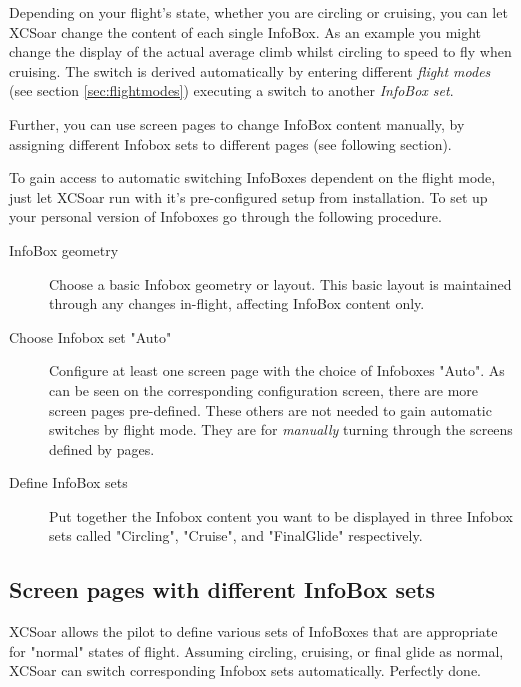 Depending on your flight's state, whether you are circling or cruising, you can
let XCSoar change the content of each single InfoBox. As an example you might
change the display of the actual average climb whilst circling to speed to fly
when cruising. The switch is derived automatically by entering different
\emph{flight modes} (see section \ref{sec:flightmodes}) executing a switch to
another \emph{InfoBox set}.

Further, you can use screen pages to change InfoBox content manually, by
assigning different Infobox sets to different pages (see following section).

To gain access to automatic switching InfoBoxes dependent on the flight mode,
just let XCSoar run with it's pre-configured setup from installation. To set up
your personal version of Infoboxes go through the following procedure.
\begin{description}
\item[InfoBox geometry] Choose a basic Infobox geometry or layout.  This basic
layout is maintained through any changes in-flight, affecting InfoBox content
only.
\item[Choose Infobox set "Auto"] Configure at least one screen page with the
choice of Infoboxes "Auto". As can be seen on the corresponding configuration
screen, there are more screen pages pre-defined.   These
others are not needed to gain automatic switches by flight mode. They are for \emph{manually} turning through the screens defined by pages.
\item[Define InfoBox sets] Put together the Infobox content you want to be
displayed in three Infobox sets called "Circling", "Cruise", and "FinalGlide"
respectively.
\end{description}


\subsection*{Screen pages with different InfoBox sets}\label{sec:screenpages}

XCSoar allows the pilot to define various sets of InfoBoxes that are
appropriate for "normal" states of flight.  Assuming circling,
cruising, or final glide as normal, XCSoar can switch corresponding Infobox
sets automatically. Perfectly done.

